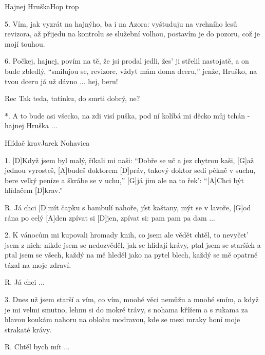 \begin{song}{Hajnej Hruška}{Hop trop}
\begin{xverse}{5. }
Vím, jak vyzrát na hajnýho, ba i na Azora:
vyštuduju na vrchního lesů revizora,
až přijedu na kontrolu se služební volhou,
postavím je do pozoru, což je mojí touhou.
\end{xverse}

\begin{xverse}{6. }
Počkej, hajnej, povím na tě, že jsi prodal jedli,
žes' ji střelil nastojatě, a on bude zbledlý,
``smilujou se, revizore, vždyť mám doma dceru,''
jenže, Hruško, na tvou dceru já už dávno ... hej, beru!
\end{xverse}

\begin{xverse}{Rec}
Tak teda, tatínku, do smrti dobrý, ne?
\end{xverse}

\begin{xverse}{*. }
A to bude asi všecko, na zdi visí puška,
pod ní kolíbá mi děcko můj tchán - hajnej Hruška ...
\end{xverse}

\end{song}

\begin{song}{Hlídač krav}{Jarek Nohavica}

\begin{xverse}{1. }
[D]Když jsem byl malý, říkali mi naši:
``Dobře se uč a jez chytrou kaši,
[G]až jednou vyrosteš, [A]budeš doktorem [D]práv,
takový doktor sedí pěkně v suchu,
bere velký peníze a škrábe se v uchu,''
[G]já jim ale na to řek': ``[A]Chci být hlídačem [D]krav.''
\end{xverse}

\begin{xverse}{R. }
Já chci [D]mít čapku s bambulí nahoře,
jíst kaštany, mýt se v lavoře,
[G]od rána po celý [A]den zpívat si [D]jen,
zpívat si: pam pam pa dam ...
\end{xverse}

\begin{xverse}{2. }
K vánocům mi kupovali hromady knih,
co jsem ale vědět chtěl, to nevyčet' jsem z nich:
nikde jsem se nedozvěděl, jak se hlídají krávy,
ptal jsem se starších a ptal jsem se všech,
každý na mě hleděl jako na pytel blech,
každý se mě opatrně tázal na moje zdraví.
\end{xverse}

\begin{xverse}{R. }
Já chci ...
\end{xverse}

\begin{xverse}{3. }
Dnes už jsem starší a vím, co vím,
mnohé věci nemůžu a mnohé smím,
a když je mi velmi smutno, lehnu si do mokré trávy,
s nohama křížem a s rukama za hlavou
koukám nahoru na oblohu modravou,
kde se mezi mraky honí moje strakaté krávy.
\end{xverse}

\begin{xverse}{R. }
Chtěl bych mít ...
\end{xverse}

\end{song}

